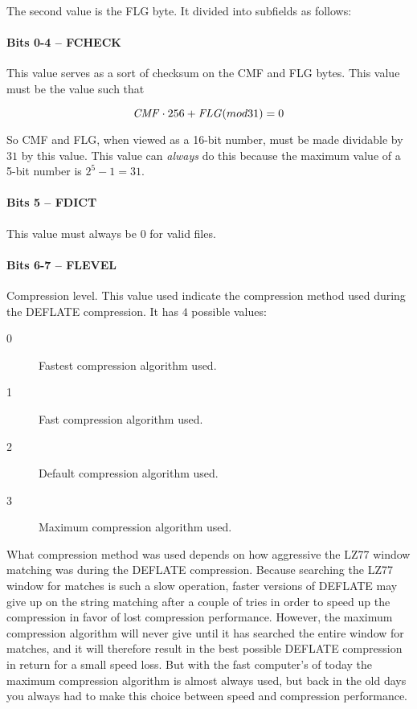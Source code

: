 The second value is the FLG byte. It divided into subfields as
follows:

\paragraph{Bits 0-4 -- FCHECK}

This value serves as a sort of checksum on the CMF and FLG bytes. This
value must be the value such that

\begin{equation*}
  \mathit{CMF} \cdot 256 + \mathit{FLG} (mod 31) = 0
\end{equation*}

So CMF and FLG, when viewed as a 16-bit number, must be made dividable
by $31$ by this value. This value can \textit{always} do this because
the maximum value of a 5-bit number is $2^5 - 1 = 31$.

\paragraph{Bits 5 -- FDICT}

This value must always be $0$ for valid \png files.

\paragraph{Bits 6-7 -- FLEVEL}

Compression level. This value used indicate the compression method used
during the DEFLATE compression. It has $4$ possible values:

\begin{description}
\item[0] Fastest compression algorithm used.
\item[1] Fast compression algorithm used.
\item[2] Default compression algorithm used.
\item[3] Maximum compression algorithm used.
\end{description}

What compression method was used depends on how aggressive the LZ77
window matching was during the DEFLATE compression. Because searching
the LZ77 window for matches is such a slow operation, faster versions
of DEFLATE may give up on the string matching after a couple of tries
in order to speed up the compression in favor of lost compression
performance. However, the maximum compression algorithm will never
give until it has searched the entire window for matches, and it will
therefore result in the best possible DEFLATE compression in return
for a small speed loss. But with the fast computer's of today the
maximum compression algorithm is almost always used, but back in the
old days you always had to make this choice between speed and
compression performance.

